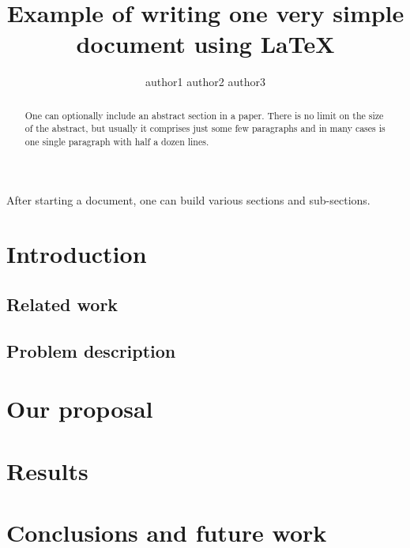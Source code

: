 \documentclass[a4paper]{paper}
\title{Example of writing one very simple document using LaTeX}
\author{author1 author2 author3}
\begin{document}
\maketitle

\begin{abstract}
One can optionally include an abstract section in a paper. There is no limit on the size of the abstract, but usually it comprises just some few paragraphs and in many cases is one single paragraph with half a dozen lines.
\end{abstract}

After starting a document, one can build various sections and sub-sections.

\section{Introduction}

\subsection{Related work}

\subsection{Problem description}

\section{Our proposal}

\section{Results}

\section{Conclusions and future work}
\end{document}
